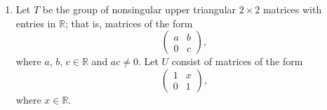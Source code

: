 {\begin{enumerate}
 
% 
% 
% 
% 
% 
% 
 
 
\bf\item\rm
Let $T$ be the group of nonsingular upper triangular $2 \times 2$
matrices with entries in ${\mathbb R}$; that is, matrices of the form
\[
\begin{pmatrix}
a & b \\
0 & c
\end{pmatrix},
\]
where $a$, $b$, $c \in {\mathbb R}$ and $ac \neq 0$. Let $U$ consist of
matrices of the form 
\[
\begin{pmatrix}
1 & x \\
0 & 1
\end{pmatrix},
\]
where $x \in {\mathbb R}$.
\begin{enumerate}
 

\end{enumerate}
\end{enumerate}}
